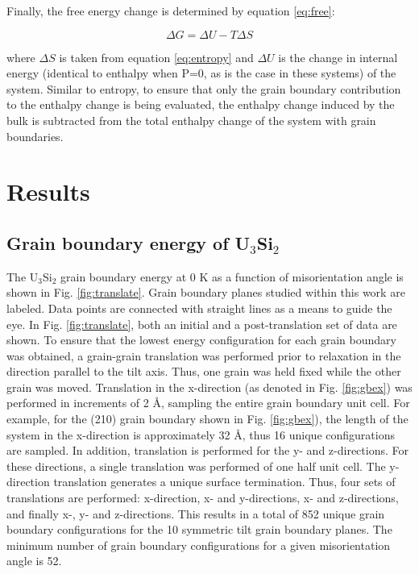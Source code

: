 \documentclass[review]{elsarticle}
\begin{document}
Finally, the free energy change is determined by equation \ref{eq:free}:

\begin{equation}
\label{eq:free}
\Delta G = \Delta U - T \Delta S
\end{equation}

where $\Delta S$ is taken from equation \ref{eq:entropy} and $\Delta U$ is the change in internal energy (identical to enthalpy when P=0, as is the case in these systems) of the system. Similar to entropy, to ensure that only the grain boundary contribution to the enthalpy change is being evaluated, the enthalpy change induced by the bulk is subtracted from the total enthalpy change of the system with grain boundaries.

\section{Results}
\subsection{Grain boundary energy of U$_{3}$Si$_{2}$}

The U$_{3}$Si$_{2}$ grain boundary energy at 0 K as a function of misorientation angle is shown in Fig. \ref{fig:translate}. Grain boundary planes studied within this work are labeled. Data points are connected with straight lines as a means to guide the eye. In Fig. \ref{fig:translate}, both an initial and a post-translation set of data are shown. To ensure that the lowest energy configuration for each grain boundary was obtained, a grain-grain translation was performed prior to relaxation in the direction parallel to the tilt axis. Thus, one grain was held fixed while the other grain was moved. Translation in the x-direction (as denoted in Fig. \ref{fig:gbex}) was performed in increments of 2 {\AA}, sampling the entire grain boundary unit cell. For example, for the (210) grain boundary shown in Fig. \ref{fig:gbex}), the length of the system in the x-direction is approximately 32 {\AA}, thus 16 unique configurations are sampled. In addition, translation is performed for the y- and z-directions. For these directions, a single translation was performed of one half unit cell. The y-direction translation generates a unique surface termination. Thus, four sets of translations are performed: x-direction, x- and y-directions, x- and z-directions, and finally x-, y- and z-directions. This results in a total of 852 unique grain boundary configurations for the 10 symmetric tilt grain boundary planes. The minimum number of grain boundary configurations for a given misorientation angle is 52. 
\end{document}
